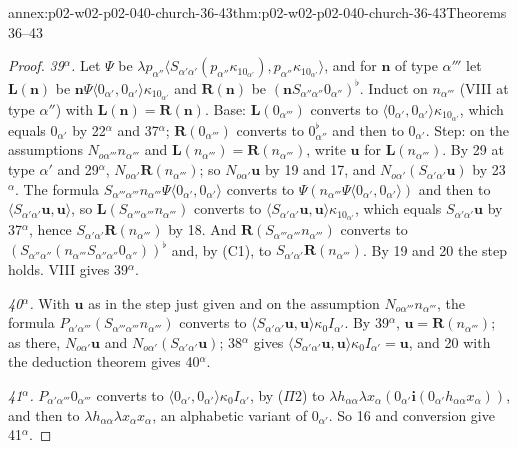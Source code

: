 \begin{annexitem}{annex:p02-w02-p02-040-church-36-43}{thm:p02-w02-p02-040-church-36-43}{Theorems 36--43}
\begin{proof}
\emph{39\(^\alpha\).}  Let \(\Psi\) be
\(\lambda p_{\alpha''}\langle S_{\alpha'\alpha'}(p_{\alpha''}\kappa_10_{\alpha'}),p_{\alpha''}\kappa_10_{\alpha'}\rangle\),
and for \(\mathbf n\) of type \(\alpha'''\) let \(\mathbf L(\mathbf n)\) be
\(\mathbf n\Psi\langle0_{\alpha'},0_{\alpha'}\rangle\kappa_10_{\alpha'}\) and
\(\mathbf R(\mathbf n)\) be
\((\mathbf nS_{\alpha''\alpha''}0_{\alpha''})^\flat\).  Induct on \(n_{\alpha'''}\)
(VIII at type \(\alpha''\)) with \(\mathbf L(\mathbf n)=\mathbf R(\mathbf n)\).
Base: \(\mathbf L(0_{\alpha'''})\) converts to
\(\langle0_{\alpha'},0_{\alpha'}\rangle\kappa_10_{\alpha'}\), which equals
\(0_{\alpha'}\) by 22\(^\alpha\) and 37\(^\alpha\); \(\mathbf R(0_{\alpha'''})\)
converts to \(0_{\alpha''}^\flat\) and then to \(0_{\alpha'}\).  Step: on the
assumptions \(N_{o\alpha'''}n_{\alpha'''}\) and
\(\mathbf L(n_{\alpha'''})=\mathbf R(n_{\alpha'''})\), write \(\mathbf u\) for
\(\mathbf L(n_{\alpha'''})\).  By 29 at type \(\alpha'\) and 29\(^\alpha\),
\(N_{o\alpha'}\mathbf R(n_{\alpha'''})\); so \(N_{o\alpha'}\mathbf u\) by 19 and
17, and \(N_{o\alpha'}(S_{\alpha'\alpha'}\mathbf u)\) by 23\(^\alpha\).  The
formula \(S_{\alpha'''\alpha'''}n_{\alpha'''}\Psi\langle0_{\alpha'},0_{\alpha'}\rangle\)
converts to \(\Psi(n_{\alpha'''}\Psi\langle0_{\alpha'},0_{\alpha'}\rangle)\) and
then to \(\langle S_{\alpha'\alpha'}\mathbf u,\mathbf u\rangle\), so
\(\mathbf L(S_{\alpha'''\alpha'''}n_{\alpha'''})\) converts to
\(\langle S_{\alpha'\alpha'}\mathbf u,\mathbf u\rangle\kappa_10_{\alpha'}\), which
equals \(S_{\alpha'\alpha'}\mathbf u\) by 37\(^\alpha\), hence
\(S_{\alpha'\alpha'}\mathbf R(n_{\alpha'''})\) by 18.  And
\(\mathbf R(S_{\alpha'''\alpha'''}n_{\alpha'''})\) converts to
\((S_{\alpha''\alpha''}(n_{\alpha'''}S_{\alpha''\alpha''}0_{\alpha''}))^\flat\) and,
by (C1), to \(S_{\alpha'\alpha'}\mathbf R(n_{\alpha'''})\).  By 19 and 20 the
step holds.  VIII gives 39\(^\alpha\).

\emph{40\(^\alpha\).}  With \(\mathbf u\) as in the step just given and on the
assumption \(N_{o\alpha'''}n_{\alpha'''}\), the formula
\(P_{\alpha'\alpha'''}(S_{\alpha'''\alpha'''}n_{\alpha'''})\) converts to
\(\langle S_{\alpha'\alpha'}\mathbf u,\mathbf u\rangle\kappa_0I_{\alpha'}\).  By
39\(^\alpha\), \(\mathbf u=\mathbf R(n_{\alpha'''})\); as there,
\(N_{o\alpha'}\mathbf u\) and \(N_{o\alpha'}(S_{\alpha'\alpha'}\mathbf u)\); 38\(^\alpha\)
gives \(\langle S_{\alpha'\alpha'}\mathbf u,\mathbf u\rangle\kappa_0I_{\alpha'}=\mathbf u\),
and 20 with the deduction theorem gives 40\(^\alpha\).

\emph{41\(^\alpha\).}  \(P_{\alpha'\alpha'''}0_{\alpha'''}\) converts to
\(\langle0_{\alpha'},0_{\alpha'}\rangle\kappa_0I_{\alpha'}\), by (\(\Pi\)2) to
\(\lambda h_{\alpha\alpha}\lambda x_\alpha(0_{\alpha'}\mathbf i(0_{\alpha'}h_{\alpha\alpha}x_\alpha))\),
and then to \(\lambda h_{\alpha\alpha}\lambda x_\alpha x_\alpha\), an alphabetic
variant of \(0_{\alpha'}\).  So 16 and conversion give 41\(^\alpha\).


\end{proof}
\end{annexitem}
